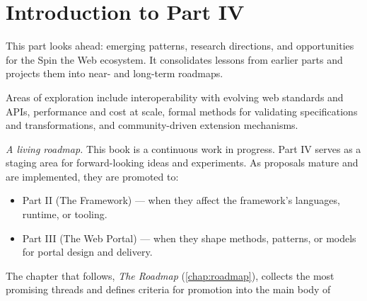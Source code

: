 
\chapter*{Introduction to Part IV}
\label{part:roadmap}

This part looks ahead: emerging patterns, research directions, and opportunities for the Spin the Web ecosystem. It consolidates lessons from earlier parts and projects them into near- and long-term roadmaps.

Areas of exploration include interoperability with evolving web standards and APIs, performance and cost at scale, formal methods for validating specifications and transformations, and community-driven extension mechanisms.

\textit{A living roadmap.} This book is a continuous work in progress. Part IV serves as a staging area for forward-looking ideas and experiments. As proposals mature and are implemented, they are promoted to:
\begin{itemize}
  \item Part II (The Framework) --- when they affect the framework’s languages, runtime, or tooling.
  \item Part III (The Web Portal) --- when they shape methods, patterns, or models for portal design and delivery.
\end{itemize}

\noindent The chapter that follows, \emph{The Roadmap} (\cref{chap:roadmap}), collects the most promising threads and defines criteria for promotion into the main body of

